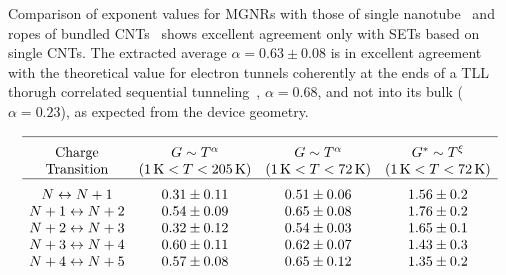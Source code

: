 Comparison of exponent values for \glspl{MGNR} with those of single nanotube~\cite{yao1999carbon} and ropes of bundled \glspl{CNT}~\cite{bockrath1999luttinger} shows excellent agreement only with \glspl{SET} based on single \glspl{CNT}. The extracted average $\alpha=0.63 \pm 0.08$ is in excellent agreement with the theoretical value for electron tunnels coherently at the ends of a \gls{TLL} thorugh correlated sequential tunneling~\cite{postma2001carbon,thorwart2002correlated}, $\alpha=0.68$, and not into its bulk ($\alpha=0.23$), as expected from the device geometry.
%
\begin{table}
    \caption{\label{tab:conductance_exponents_temp}
        Power-law exponents for the conductance $G$ and integrated conductance $G^*$ across two different temperature ranges. Errors on the single charge transition are standard fitting errors, whereas error on the averages are estimated through error propagation formula.}
    \[
        \begin{array}{cccc}
            \hline \textrm{Charge} & G\sim T^\alpha                            & G\sim T^\alpha                           & G^*\sim T^\xi \Tsmall                                        \\
            \textrm{Transition}    & (\SI{1}{\kelvin} < T < \SI{205}{\kelvin}) & (\SI{1}{\kelvin} < T < \SI{72}{\kelvin}) & (\SI{1}{\kelvin} < T < \SI{72}{\kelvin})                     \\
            \hline
            N\leftrightarrow N+1   & 0.31 \pm 0.11                             & 0.51 \pm 0.06                            & 1.56 \pm 0.2                                        \Tsmall  \\
            N+1\leftrightarrow N+2 & 0.54 \pm 0.09                             & 0.65 \pm 0.08                            & 1.76 \pm 0.2                                                 \\
            N+2\leftrightarrow N+3 & 0.32 \pm 0.12                             & 0.54 \pm 0.03                            & 1.65 \pm 0.1                                                 \\
            N+3\leftrightarrow N+4 & 0.60 \pm 0.11                             & 0.62 \pm 0.07                            & 1.43 \pm 0.3                                                 \\
            N+4\leftrightarrow N+5 & 0.57 \pm 0.08                             & 0.65 \pm 0.12                            & 1.35 \pm 0.2                                                 \\

\end{array}\]
\end{table}
